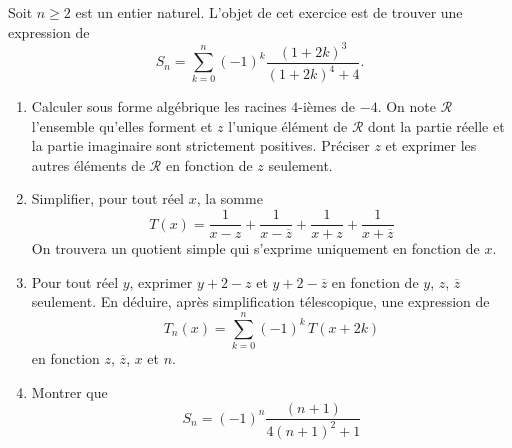 Soit $n\geq 2$ est un entier naturel. L'objet de cet exercice est de trouver une expression de
\begin{displaymath}
 S_n = \sum_{k=0}^n (-1)^k \frac{(1+2k)^3}{(1+2k)^4 + 4}.
\end{displaymath}

\begin{enumerate}
 \item Calculer sous forme algébrique les racines $4$-ièmes de $-4$.\newline
 On note $\mathcal{R}$ l'ensemble qu'elles forment et $z$ l'unique élément de $\mathcal{R}$ dont la partie réelle et la partie imaginaire sont strictement positives.\newline
 Préciser $z$ et exprimer les autres éléments de $\mathcal{R}$ en fonction de $z$ seulement.
 \item Simplifier, pour tout réel $x$, la somme
\begin{displaymath}
 T(x) = \frac{1}{x - z} + \frac{1}{x - \overline{z}} + \frac{1}{x + z} + \frac{1}{x + \overline{z}}
\end{displaymath}
On trouvera un quotient simple qui s'exprime uniquement en fonction de $x$.

\item Pour tout réel $y$, exprimer $y+2-z$ et $y+2 -\overline{z}$ en fonction de $y$, $z$, $\overline{z}$ seulement.\newline
En déduire, après simplification télescopique, une expression de
\begin{displaymath}
 T_n(x) = \sum_{k=0}^n (-1)^k\,T(x+2k)
\end{displaymath}
en fonction $z$, $\overline{z}$, $x$ et $n$.

\item Montrer que
\begin{displaymath}
 S_n = (-1)^n\frac{(n+1)}{4(n+1)^2 + 1}
\end{displaymath}


\end{enumerate}
